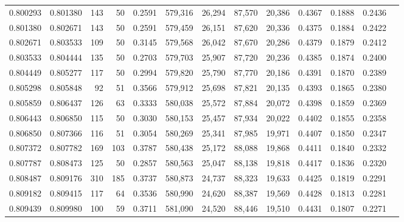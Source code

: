 \begin{tabular}{rrrrrrrrrrrrr}
0.800293 & 0.801380 &   143 &  50 &                                     0.2591 & 579,316 &  26,294 &  87,570 &  20,386 & 0.4367 & 0.1888 & 0.2436 \\
0.801380 & 0.802671 &   143 &  50 &                                     0.2591 & 579,459 &  26,151 &  87,620 &  20,336 & 0.4375 & 0.1884 & 0.2422 \\
0.802671 & 0.803533 &   109 &  50 &                                     0.3145 & 579,568 &  26,042 &  87,670 &  20,286 & 0.4379 & 0.1879 & 0.2412 \\
0.803533 & 0.804444 &   135 &  50 &                                     0.2703 & 579,703 &  25,907 &  87,720 &  20,236 & 0.4385 & 0.1874 & 0.2400 \\
0.804449 & 0.805277 &   117 &  50 &                                     0.2994 & 579,820 &  25,790 &  87,770 &  20,186 & 0.4391 & 0.1870 & 0.2389 \\
0.805298 & 0.805848 &    92 &  51 &                                     0.3566 & 579,912 &  25,698 &  87,821 &  20,135 & 0.4393 & 0.1865 & 0.2380 \\
0.805859 & 0.806437 &   126 &  63 &                                     0.3333 & 580,038 &  25,572 &  87,884 &  20,072 & 0.4398 & 0.1859 & 0.2369 \\
0.806443 & 0.806850 &   115 &  50 &                                     0.3030 & 580,153 &  25,457 &  87,934 &  20,022 & 0.4402 & 0.1855 & 0.2358 \\
0.806850 & 0.807366 &   116 &  51 &                                     0.3054 & 580,269 &  25,341 &  87,985 &  19,971 & 0.4407 & 0.1850 & 0.2347 \\
0.807372 & 0.807782 &   169 & 103 &                                     0.3787 & 580,438 &  25,172 &  88,088 &  19,868 & 0.4411 & 0.1840 & 0.2332 \\
0.807787 & 0.808473 &   125 &  50 &                                     0.2857 & 580,563 &  25,047 &  88,138 &  19,818 & 0.4417 & 0.1836 & 0.2320 \\
0.808487 & 0.809176 &   310 & 185 &                                     0.3737 & 580,873 &  24,737 &  88,323 &  19,633 & 0.4425 & 0.1819 & 0.2291 \\
0.809182 & 0.809415 &   117 &  64 &                                     0.3536 & 580,990 &  24,620 &  88,387 &  19,569 & 0.4428 & 0.1813 & 0.2281 \\
0.809439 & 0.809980 &   100 &  59 &                                     0.3711 & 581,090 &  24,520 &  88,446 &  19,510 & 0.4431 & 0.1807 & 0.2271 \\

\end{tabular}
